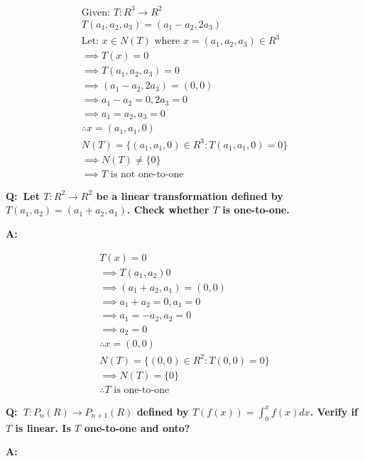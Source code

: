 \documentclass[english,course,fleqn]{lecture}
\newenvironment{qanda}{\setlength{\parindent}{0pt}}{\bigskip}
\newcommand{\Q}{\bigskip\bfseries Q:\ }
\newcommand{\A}{\par\textbf{A:} \normalfont}
\begin{document}
\begin{qanda}
  \begin{gather*}
    \text{Given: } T:R^{3} \rightarrow R^{2}\\
    T(a_{1}, a_{2}, a_{3}) = (a_{1} - a_{2}, 2 a_{3})\\
    \text{Let: $x \in N(T)$ where $x = (a_{1}, a_{2}, a_{3}) \in R^{3}$}\\
    \implies T(x) = 0\\
    \implies T(a_{1}, a_{2}, a_{3}) = 0\\
    \implies (a_{1} - a_{2}, 2 a_{3}) = (0,0)\\
    \implies a_{1} - a_{2} = 0, 2 a_{3} = 0\\
    \implies a_{1} = a_{2}, a_{3} = 0\\
    \therefore x = (a_{1}, a_{1}, 0)\\
    N(T) = \{(a_{1}, a_{1},0) \in R^{3}: T(a_{1}, a_{1}, 0) = 0 \}\\
    \implies N(T) \ne \{0\}\\
    \implies T \text{ is not one-to-one}
  \end{gather*}

  \Q Let $T:R^{2} \rightarrow R^{2}$ be a linear transformation defined by $T(a_{1}, a_{2}) = (a_{1} + a_{2}, a_{1})$.
  Check whether $T$ is one-to-one.

  \A 

  \begin{gather*}
    T(x) = 0\\
    \implies T(a_{1}, a_{2}) 0\\
    \implies (a_{1} + a_{2}, a_{1}) = (0,0)\\
    \implies a_{1} + a_{2} = 0, a_{1} = 0\\
    \implies a_{1} = -a_{2}, a_{2} = 0\\
    \implies a_{2} = 0\\
    \therefore x = (0,0)\\
    N(T) = \{(0,0) \in R^{2}:T(0,0) = 0\}\\
    \implies N(T) = \{0\}\\
    \therefore \text{$T$ is one-to-one}
  \end{gather*}

  \Q $T:P_{n}(R) \rightarrow P_{n+1}(R)$ defined by $T(f(x)) = \int_{0}^{x}f(x)dx$.
  Verify if $T$ is linear. Is $T$ one-to-one and onto?

  \A


\end{qanda}
\end{document}

